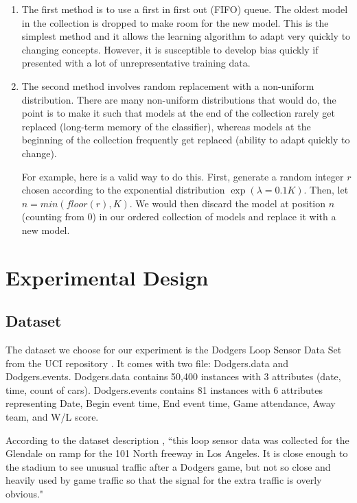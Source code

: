 \documentclass[conference]{IEEEtran}
\begin{document}
\begin{enumerate}
	\item The first method is to use a first in first out (FIFO) queue. The oldest model in the collection is dropped to make room for the new model. This is the simplest method and it allows the learning algorithm to adapt very quickly to changing concepts. However, it is susceptible to develop bias quickly if presented with a lot of unrepresentative training data.
	\item The second method involves random replacement with a non-uniform distribution. There are many non-uniform distributions that would do, the point is to make it such that models at the end of the collection rarely get replaced (long-term memory of the classifier), whereas models at the beginning of the collection frequently get replaced (ability to adapt quickly to change).
	
	For example, here is a valid way to do this. First, generate a random integer $r$ chosen according to the exponential distribution $\exp(\lambda = 0.1 K)$. Then, let $n = min(floor(r), K)$. We would then discard the model at position $n$ (counting from 0) in our ordered collection of models and replace it with a new model.
\end{enumerate}




\section{Experimental Design}
\label{sec:experimental-design}
\subsection{Dataset}
The dataset we choose for our experiment is the Dodgers Loop Sensor Data Set from the UCI repository \cite{dataset}. It comes with two file: Dodgers.data and Dodgers.events. Dodgers.data contains 50,400 instances with 3 attributes (date, time, count of cars). Dodgers.events contains 81 instances with 6 attributes representing  Date, Begin event time, End event time, Game attendance, Away team, and W/L score. 

According to the dataset description \cite{dataset}, ``this loop sensor data was collected for the Glendale on ramp for the 101 North freeway in Los Angeles. It is close enough to the stadium to see unusual traffic after a Dodgers game, but not so close and heavily used by game traffic so that the signal for the extra traffic is overly obvious." 
\end{document}
